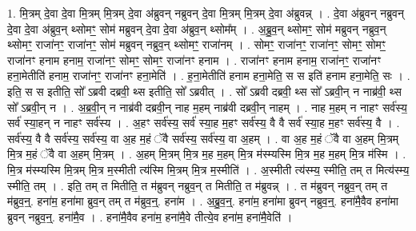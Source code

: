 \documentclass[17pt]{extarticle}
\begin{document}
1. मि॒त्रम् दे॒वा दे॒वा मि॒त्रम् मि॒त्रम् दे॒वा अ॑ब्रुवन् नब्रुवन् दे॒वा मि॒त्रम् मि॒त्रम् दे॒वा अ॑ब्रुवन्न् । . दे॒वा अ॑ब्रुवन् नब्रुवन् दे॒वा दे॒वा अ॑ब्रुव॒न् थ्सोमꣳ॒॒ सोम॑ मब्रुवन् दे॒वा दे॒वा अ॑ब्रुव॒न् थ्सोम᳚म् । . अ॒ब्रु॒व॒न् थ्सोमꣳ॒॒ सोम॑ मब्रुवन् नब्रुव॒न् थ्सोमꣳ॒॒ राजा॑नꣳ॒॒ राजा॑नꣳ॒॒ सोम॑ मब्रुवन् नब्रुव॒न् थ्सोमꣳ॒॒ राजा॑नम् । . सोमꣳ॒॒ राजा॑नꣳ॒॒ राजा॑नꣳ॒॒ सोमꣳ॒॒ सोमꣳ॒॒ राजा॑नꣳ हनाम हनाम॒ राजा॑नꣳ॒॒ सोमꣳ॒॒ सोमꣳ॒॒ राजा॑नꣳ हनाम । . राजा॑नꣳ हनाम हनाम॒ राजा॑नꣳ॒॒ राजा॑नꣳ हना॒मेतीति॑ हनाम॒ राजा॑नꣳ॒॒ राजा॑नꣳ हना॒मेति॑ । . ह॒ना॒मेतीति॑ हनाम हना॒मेति॒ स स इति॑ हनाम हना॒मेति॒ सः । . इति॒ स स इतीति॒ सो᳚ ऽब्रवी दब्रवी॒ थ्स इतीति॒ सो᳚ ऽब्रवीत् । . सो᳚ ऽब्रवी दब्रवी॒ थ्स सो᳚ ऽब्रवी॒न् न नाब्र॑वी॒ थ्स सो᳚ ऽब्रवी॒न् न । . अ॒ब्र॒वी॒न् न नाब्र॑वी दब्रवी॒न् नाह म॒हम् नाब्र॑वी दब्रवी॒न् नाहम् । . नाह म॒हम् न नाहꣳ सर्व॑स्य॒ सर्व॑ स्या॒हन् न नाहꣳ सर्व॑स्य । . अ॒हꣳ सर्व॑स्य॒ सर्व॑ स्या॒ह म॒हꣳ सर्व॑स्य॒ वै वै सर्व॑ स्या॒ह म॒हꣳ सर्व॑स्य॒ वै । . सर्व॑स्य॒ वै वै सर्व॑स्य॒ सर्व॑स्य॒ वा अ॒ह म॒हं ॅवै सर्व॑स्य॒ सर्व॑स्य॒ वा अ॒हम् । . वा अ॒ह म॒हं ॅवै वा अ॒हम् मि॒त्रम् मि॒त्र म॒हं ॅवै वा अ॒हम् मि॒त्रम् । . अ॒हम् मि॒त्रम् मि॒त्र म॒ह म॒हम् मि॒त्र म॑स्म्यस्मि मि॒त्र म॒ह म॒हम् मि॒त्र म॑स्मि । . मि॒त्र म॑स्म्यस्मि मि॒त्रम् मि॒त्र म॒स्मीती त्य॑स्मि मि॒त्रम् मि॒त्र म॒स्मीति॑ । . अ॒स्मीती त्य॑स्म्य॒ स्मीति॒ तम् त मित्य॑स्म्य॒ स्मीति॒ तम् । . इति॒ तम् त मितीति॒ त म॑ब्रुवन् नब्रुव॒न् त मितीति॒ त म॑ब्रुवन्न् । . त म॑ब्रुवन् नब्रुव॒न् तम् त म॑ब्रुव॒न्॒. हना॑म॒ हना॑मा ब्रुव॒न् तम् त म॑ब्रुव॒न्॒. हना॑म । . अ॒ब्रु॒व॒न्॒. हना॑म॒ हना॑मा ब्रुवन् नब्रुव॒न्॒. हना॑मै॒वैव हना॑मा ब्रुवन् नब्रुव॒न्॒. हना॑मै॒व । . हना॑मै॒वैव हना॑म॒ हना॑मै॒वे तीत्ये॒व हना॑म॒ हना॑मै॒वेति॑ । \newline
\end{document}
